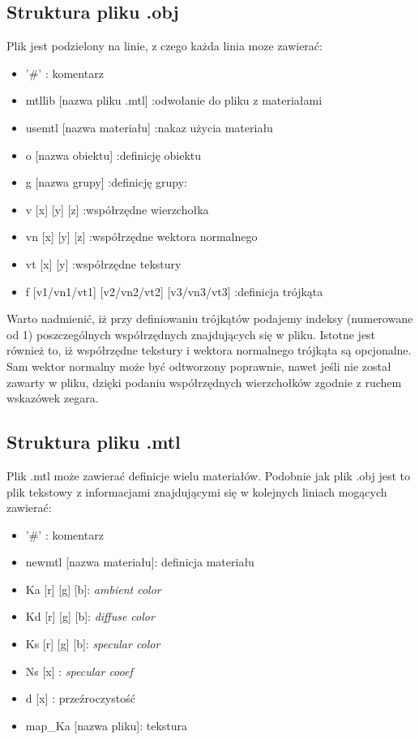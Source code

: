 \subsection{Struktura pliku .obj}
Plik jest podzielony na linie, z czego każda linia moze zawierać:
\begin{itemize}
\item '\#' : komentarz 
\item mtllib [nazwa pliku .mtl] :odwołanie do pliku z materiałami
\item usemtl [nazwa materiału]  :nakaz użycia materiału
\item o [nazwa obiektu]         :definicję obiektu
\item g [nazwa grupy]           :definicję grupy: 
\item v [x] [y] [z]             :współrzędne wierzchołka
\item vn [x] [y] [z]            :współrzędne wektora normalnego
\item vt [x] [y]                :współrzędne tekstury
\item f [v1/vn1/vt1] [v2/vn2/vt2] [v3/vn3/vt3] :definicja trójkąta 
\end{itemize}
Warto nadmienić, iż przy definiowaniu trójkątów podajemy indeksy (numerowane od 1) poszczególnych współrzędnych znajdujących się w pliku.
Istotne jest również to, iż współrzędne tekstury i wektora normalnego trójkąta są opcjonalne. Sam wektor normalny może być odtworzony poprawnie,
nawet jeśli nie został zawarty w pliku, dzięki podaniu współrzędnych wierzchołków zgodnie z ruchem wskazówek zegara.


\subsection{Struktura pliku .mtl}
Plik .mtl może zawierać definicje wielu materiałów. Podobnie jak plik .obj jest to plik tekstowy z informacjami znajdującymi
się w kolejnych liniach mogących zawierać:
\begin{itemize}
\item '\#' : komentarz 
\item newmtl [nazwa materiału]: definicja materiału
\item Ka [r] [g] [b]: \textit{ambient color}
\item Kd [r] [g] [b]: \textit{diffuse color}
\item Ks [r] [g] [b]: \textit{specular color}
\item Ns [x]        : \textit{specular cooef}
\item d  [x]        : przeźroczystość
\item map\_Ka [nazwa pliku]: tekstura 
\end{itemize}


